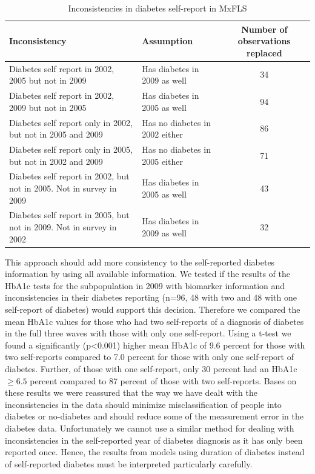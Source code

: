 \documentclass[12pt,english,british]{article}
\providecommand{\tabularnewline}{\\}
\begin{document}
\begin{appendix}
\begin{table}[h!]
\caption{\label{tab:Inconsistencies}Inconsistencies in diabetes self-report in MxFLS}
\begin{center}
\begin{adjustbox}{max width=\textwidth}
\begin{tabular}{llc}
\hline 
Inconsistency  & Assumption  & Number of observations replaced\tabularnewline
\hline 
Diabetes self report in 2002, 2005 but not in 2009  & Has diabetes in 2009 as well  & 34\tabularnewline
Diabetes self report in 2002, 2009 but not in 2005  & Has diabetes in 2005 as well  & 94\tabularnewline
Diabetes self report only in 2002, but not in 2005 and 2009  & Has no diabetes in 2002 either  & 86\tabularnewline
Diabetes self report only in 2005, but not in 2002 and 2009  & Has no diabetes in 2005 either  & 71\tabularnewline
Diabetes self report in 2002, but not in 2005. Not in survey in 2009  & Has diabetes in 2005 as well  & 43\tabularnewline
Diabetes self report in 2005, but not in 2009. Not in survey in 2002  & Has diabetes in 2009 as well  & 32\tabularnewline
\end{tabular}
\end{adjustbox}
\end{center}
\end{table}


This approach should add more consistency to the self-reported diabetes
information by using all available information. We tested if the results
of the \ac{HbA1c} tests for the subpopulation in 2009 with biomarker
information and inconsistencies in their diabetes reporting (n=96,
48 with two and 48 with one self-report of diabetes) would support
this decision. Therefore we compared the mean \ac{HbA1c} values for those
who had two self-reports of a diagnosis of diabetes in the full three
waves with those with only one self-report. Using a t-test we found
a significantly (p<0.001) higher mean \ac{HbA1c} of 9.6 percent
for those with two self-reports compared to 7.0 percent for those
with only one self-report of diabetes. Further, of those with one
self-report, only 30 percent had an \ac{HbA1c}$\geq6.5$ percent
compared to 87 percent of those with two self-reports. Bases on these results we were reassured that the way we have dealt with the inconsistencies in the data should
minimize misclassification of people into diabetes or no-diabetes
and should reduce some of the measurement error in the diabetes data. Unfortunately we cannot use a similar method for dealing with inconsistencies
in the self-reported year of diabetes diagnosis as it has only been reported once. Hence, the results from models using
duration of diabetes instead of self-reported diabetes must be interpreted
particularly carefully.

\end{appendix}
\end{document}
